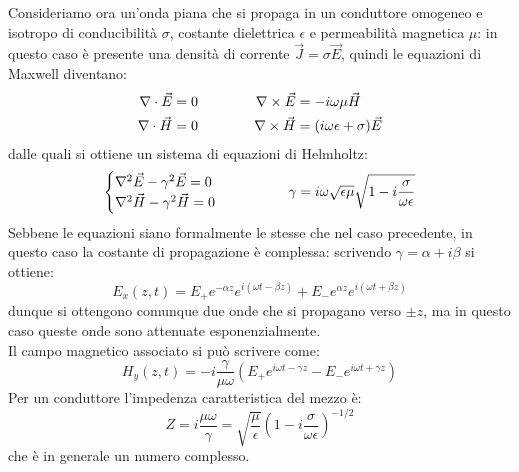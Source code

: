 Consideriamo ora un'onda piana che si propaga in un conduttore omogeneo e isotropo di conducibilità $ \sigma $, costante dielettrica $ \epsilon $ e permeabilità magnetica $ \mu $: in questo caso è presente una densità di corrente $ \vec{J} = \sigma\vec{E} $, quindi le equazioni di Maxwell diventano:
\begin{equation}
	\begin{split}
		\nabla\cdot\vec{E} &= 0 \\ 
		\nabla\cdot\vec{H} &= 0 
	\end{split}
	\qquad\qquad
	\begin{split}
		\nabla\times\vec{E} &= - i\omega \mu \vec{H} \\ 
		\nabla\times\vec{H} &= (i\omega \epsilon + \sigma) \vec{E}
	\end{split}
	\label{eq:18}
\end{equation}
dalle quali si ottiene un sistema di equazioni di Helmholtz:
\begin{equation}
	\begin{cases}
		\nabla^2\vec{E} - \gamma^2 \vec{E} = 0 \\ 
		\nabla^2\vec{H} - \gamma^2 \vec{H} = 0 
	\end{cases}
	\qquad\qquad \gamma = i \omega \sqrt{\epsilon\mu} \sqrt{1 - i \frac{\sigma}{\omega\epsilon}}
	\label{eq:19}
\end{equation}
Sebbene le equazioni siano formalmente le stesse che nel caso precedente, in questo caso la costante di propagazione è complessa: scrivendo $ \gamma = \alpha + i\beta $ si ottiene:
\begin{equation}
	E_x (z,t) = E_+ e^{-\alpha z} e^{i(\omega t - \beta z)} + E_- e^{\alpha z} e^{i(\omega t + \beta z)}
	\label{eq:20}
\end{equation}
dunque si ottengono comunque due onde che si propagano verso $ \pm z $, ma in questo caso queste onde sono attenuate esponenzialmente. \\ 
%
Il campo magnetico associato si può scrivere come:
\begin{equation}
	H_y (z,t) = -i\frac{\gamma}{\mu \omega} \left(E_+ e^{i\omega t - \gamma z} - E_- e^{i\omega t + \gamma z}\right)
	\label{eq:21}
\end{equation}
%
Per un conduttore l'impedenza caratteristica del mezzo è:
\begin{equation}
	Z = i \frac{\mu \omega}{\gamma} = \sqrt{\frac{\mu}{\epsilon}} \left(1 - i \frac{\sigma}{\omega \epsilon}\right)^{-1/2}
	\label{eq:22}
\end{equation}
che è in generale un numero complesso. \\ 
